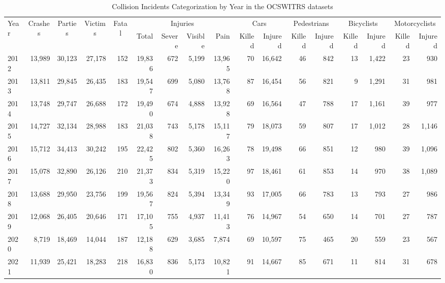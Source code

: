 \begin{sidewaystable}[h]
\centering
\caption{Collision Incidents Categorization by Year in the OCSWITRS datasets} 
\label{Tbl5}
\begin{tabular}{lrrrrrrrrrrrrrrrr}
  \toprule
  \multirow[c]{2}{*}{Year} & \multicolumn{1}{c}{\multirow{2}{*}{Crashes}} & \multicolumn{1}{c}{\multirow{2}{*}{Parties}} & \multicolumn{1}{c}{\multirow{2}{*}{Victims}} & \multicolumn{1}{c}{\multirow{2}{*}{Fatal}} & \multicolumn{4}{c}{Injuries} & \multicolumn{2}{c}{Cars} & \multicolumn{2}{c}{Pedestrians} & \multicolumn{2}{c}{Bicyclists} & \multicolumn{2}{c}{Motorcyclists} \\
 \cmidrule{6-9}\cmidrule{10-11}\cmidrule{12-13}\cmidrule{14-15}\cmidrule{16-17}%
 &  &  &  &  & {Total} & {Severe} & {Visible} & {Pain} & {Killed} & {Injured} & {Killed} & {Injured} & {Killed} & {Injured} & {Killed} & {Injured} \\ 
 \midrule
2012 & 13,989 & 30,123 & 27,178 & 152 & 19,836 & 672 & 5,199 & 13,965 &  70 & 16,642 &  46 & 842 &  13 & 1,422 &  23 & 930 \\ 
  2013 & 13,811 & 29,845 & 26,435 & 183 & 19,547 & 699 & 5,080 & 13,768 &  87 & 16,454 &  56 & 821 &   9 & 1,291 &  31 & 981 \\ 
  2014 & 13,748 & 29,747 & 26,688 & 172 & 19,490 & 674 & 4,888 & 13,928 &  69 & 16,564 &  47 & 788 &  17 & 1,161 &  39 & 977 \\ 
  2015 & 14,727 & 32,134 & 28,988 & 183 & 21,038 & 743 & 5,178 & 15,117 &  79 & 18,073 &  59 & 807 &  17 & 1,012 &  28 & 1,146 \\ 
  2016 & 15,712 & 34,413 & 30,242 & 195 & 22,425 & 802 & 5,360 & 16,263 &  78 & 19,498 &  66 & 851 &  12 & 980 &  39 & 1,096 \\ 
  2017 & 15,078 & 32,890 & 26,126 & 210 & 21,373 & 834 & 5,319 & 15,220 &  97 & 18,461 &  61 & 853 &  14 & 970 &  38 & 1,089 \\ 
  2018 & 13,688 & 29,950 & 23,756 & 199 & 19,567 & 824 & 5,394 & 13,349 &  93 & 17,005 &  66 & 783 &  13 & 793 &  27 & 986 \\ 
  2019 & 12,068 & 26,405 & 20,646 & 171 & 17,105 & 755 & 4,937 & 11,413 &  76 & 14,967 &  54 & 650 &  14 & 701 &  27 & 787 \\ 
  2020 & 8,719 & 18,469 & 14,044 & 187 & 12,188 & 629 & 3,685 & 7,874 &  69 & 10,597 &  75 & 465 &  20 & 559 &  23 & 567 \\ 
  2021 & 11,939 & 25,421 & 18,283 & 218 & 16,830 & 836 & 5,173 & 10,821 &  91 & 14,667 &  85 & 671 &  11 & 814 &  31 & 678 \\ 

\end{tabular}
\end{sidewaystable}
